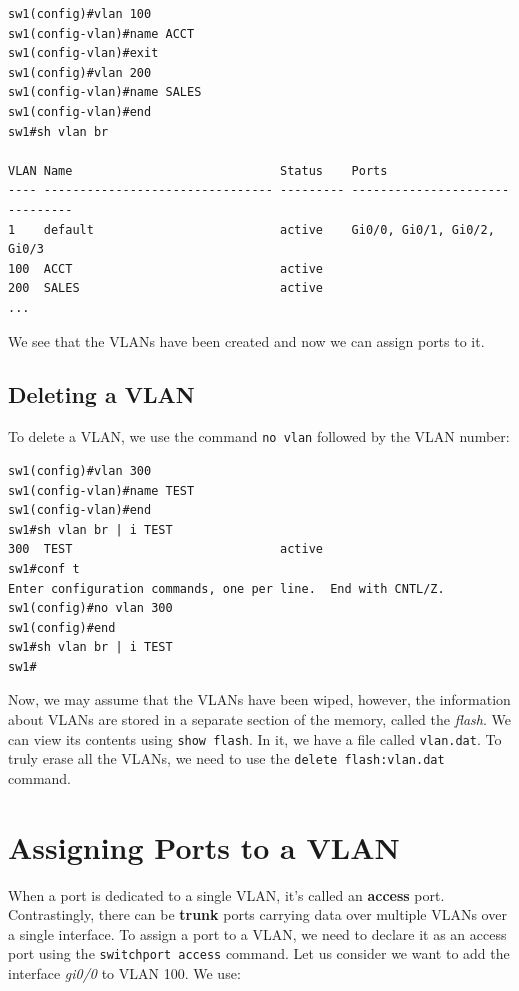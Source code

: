 \vspace{-15pt}
\begin{verbatim}
sw1(config)#vlan 100
sw1(config-vlan)#name ACCT
sw1(config-vlan)#exit
sw1(config)#vlan 200
sw1(config-vlan)#name SALES
sw1(config-vlan)#end
sw1#sh vlan br

VLAN Name                             Status    Ports
---- -------------------------------- --------- -------------------------------
1    default                          active    Gi0/0, Gi0/1, Gi0/2, Gi0/3
100  ACCT                             active
200  SALES                            active
...
\end{verbatim}
\vspace{-10pt}

\noindent
We see that the VLANs have been created and now we can assign ports to it.

\subsection{Deleting a VLAN}
To delete a VLAN, we use the command \verb|no vlan| followed by the VLAN number:

\vspace{-15pt}
\begin{verbatim}
sw1(config)#vlan 300
sw1(config-vlan)#name TEST
sw1(config-vlan)#end
sw1#sh vlan br | i TEST
300  TEST                             active
sw1#conf t
Enter configuration commands, one per line.  End with CNTL/Z.
sw1(config)#no vlan 300
sw1(config)#end
sw1#sh vlan br | i TEST
sw1#
\end{verbatim}
\vspace{-10pt}

\noindent
Now, we may assume that the VLANs have been wiped, however, the information about VLANs are stored in a separate section of the memory, called the \textit{flash}. We can view its contents using \verb|show flash|. In it, we have a file called \verb|vlan.dat|. To truly erase all the VLANs, we need to use the \verb|delete flash:vlan.dat| command. 

\section{Assigning Ports to a VLAN}
When a port is dedicated to a single VLAN, it's called an \textbf{access} port. Contrastingly, there can be \textbf{trunk} ports carrying data over multiple VLANs over a single interface. To assign a port to a VLAN, we need to declare it as an access port using the \verb|switchport access| command. Let us consider we want to add the interface \textit{gi0/0} to VLAN 100. We use:

